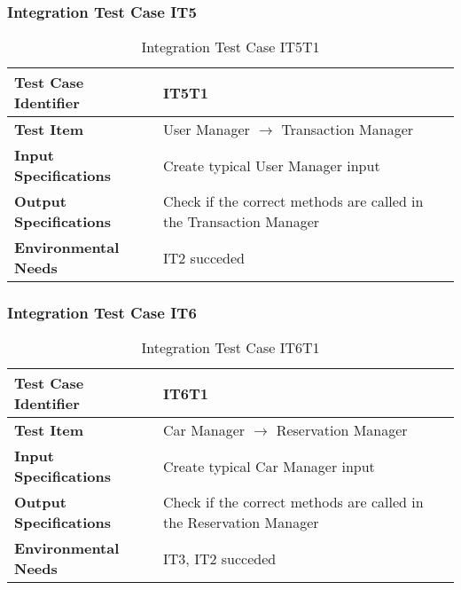 \subsubsection{Integration Test Case IT5} \label{sssec:IT5}
\vspace{16pt}
\begin{table}[htbp]
\begin{center}
\renewcommand{\arraystretch}{1.5}
\begin{tabular}{l|p{}}
\hline
\textbf{Test Case Identifier} & IT5T1\\
\hline
\textbf{Test Item} & User Manager $\rightarrow$ Transaction Manager\\
\hline
\textbf{Input Specifications} & Create typical User Manager input \\
\hline
\textbf{Output Specifications} & Check if the correct methods are called in the Transaction Manager \\
\hline
\textbf{Environmental Needs} & IT2 succeded\\
\hline
\end{tabular}
\caption{Integration Test Case IT5T1}
\end{center}
\end{table}

\vspace{10pt}
\subsubsection{Integration Test Case IT6} \label{sssec:IT6}
\vspace{16pt}
\begin{table}[htbp]
\begin{center}
\renewcommand{\arraystretch}{1.5}
\begin{tabular}{l|p{}}
\hline
\textbf{Test Case Identifier} & IT6T1\\
\hline
\textbf{Test Item} & Car Manager $\rightarrow$ Reservation Manager\\
\hline
\textbf{Input Specifications} & Create typical Car Manager input \\
\hline
\textbf{Output Specifications} & Check if the correct methods are called in the Reservation Manager \\
\hline
\textbf{Environmental Needs} & IT3, IT2 succeded\\
\hline
\end{tabular}
\caption{Integration Test Case IT6T1}
\end{center}
\end{table}
\clearpage

